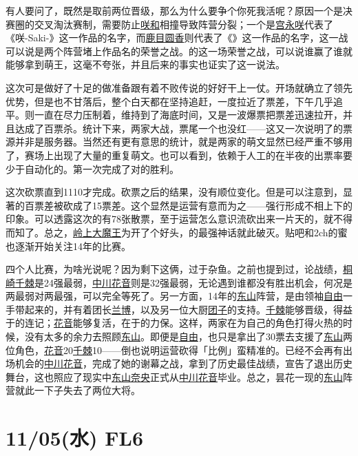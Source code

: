 有人要问了，既然是取前两位晋级，那么为什么要争个你死我活呢？原因一个是决赛圈的交叉淘汰赛制，需要防止\uline{咲}\uline{和}相撞导致阵营分裂；一个是\uline{宫永咲}代表了《咲-Saki-》这一作品的名字，而\uline{鹿目圆香}则代表了《\Mado》这一作品的名字，这一战可以说是两个阵营堵上作品名的荣誉之战。的这一场荣誉之战，可以说谁赢了谁就能够拿到萌王，这毫不夸张，并且后来的事实也证实了这一说法。

这次可是做好了十足的做准备跟有着不败传说的好好干上一仗。开场就确立了领先优势，但是也不甘落后，整个白天都在坚持追赶，一度拉近了票差，下午几乎追平。则一直在尽力压制着，维持到了海底时间，又是一波爆票把票差迅速拉开，并且达成了百票杀。统计下来，两家大战，票尾一个也没红——这又一次说明了的票源并非是服务器。当然还有更有意思的统计，就是两家的萌文显然已经严重不够用了，赛场上出现了大量的重复萌文。也可以看到，依赖于人工的在半夜的出票率要少于自动化的。第一次完成了对的胜利。

这次砍票直到1110才完成。砍票之后的结果，没有顺位变化。但是可以注意到，显著的百票差被砍成了15票差。这个显然是运营有意而为之——强行形成不相上下的印象。可以透露这次的有78张散票，至于运营怎么意识流砍出来一片天的，就不得而知了。总之，\uline{岭上大魔王}为开了个好头，的最强神话就此破灭。贴吧和2ch的蜜也逐渐开始关注14年的比赛。

四个人比赛，为啥光说呢？因为剩下这俩，过于杂鱼。之前也提到过，论战绩，\uline{桐崎千棘}是24强最弱，\uline{中川花音}则是32强最弱，无论遇到谁都没有胜出机会，何况是两最弱对两最强，可以完全等死了。另一方面，14年的\uline{东山}阵营，是由领袖\uline{自由}一手带起来的，并有着团长\uline{兰博}，以及另一位大厨\uline{团子}的支持。\uline{千棘}能够晋级，得益于的连记；\uline{花音}能够复活，在于的力保。这样，两家在为自己的角色打得火热的时候，没有太多的余力去照顾\uline{东山}。即便是\uline{自由}，也只是拿出了30票去支援了\uline{东山}两位角色，\uline{花音}20\uline{千棘}10——倒也说明运营砍得「比例」蛮精准的。已经不会再有出场机会的\uline{中川花音}，完成了她的谢幕之战，拿到了历史最佳战绩，宣告了退出历史舞台，这也照应了现实中\uline{东山奈央}正式从\uline{中川花音}毕业。总之，昙花一现的\uline{东山}阵营就此一下子失去了两位大将。

\section{11/05(水) FL6}

